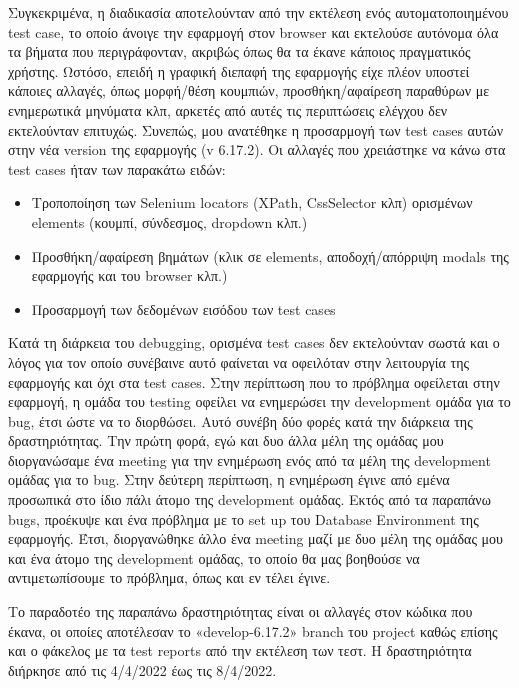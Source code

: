 Συγκεκριμένα, η διαδικασία αποτελούνταν από την εκτέλεση ενός αυτοματοποιημένου test case, το οποίο άνοιγε την εφαρμογή στον browser και 
εκτελούσε αυτόνομα όλα τα βήματα που περιγράφονταν, ακριβώς όπως θα τα έκανε κάποιος πραγματικός χρήστης. Ωστόσο, επειδή η γραφική διεπαφή 
της εφαρμογής είχε πλέον υποστεί κάποιες αλλαγές, όπως μορφή/θέση κουμπιών, προσθήκη/αφαίρεση παραθύρων με ενημερωτικά μηνύματα κλπ, αρκετές 
από αυτές τις περιπτώσεις ελέγχου δεν εκτελούνταν επιτυχώς. Συνεπώς, μου ανατέθηκε η προσαρμογή των test cases αυτών στην νέα version της 
εφαρμογής (v 6.17.2). Οι αλλαγές που χρειάστηκε να κάνω στα test cases ήταν των παρακάτω ειδών:

\begin{itemize}
    \item Τροποποίηση των Selenium locators (XPath, CssSelector κλπ) ορισμένων elements (κουμπί, σύνδεσμος, dropdown κλπ.)
    \item Προσθήκη/αφαίρεση βημάτων (κλικ σε elements, αποδοχή/απόρριψη modals της εφαρμογής και του browser κλπ.)
    \item Προσαρμογή των δεδομένων εισόδου των test cases 
\end{itemize}

Κατά τη διάρκεια του debugging, ορισμένα test cases δεν εκτελούνταν σωστά και ο λόγος για τον οποίο συνέβαινε αυτό φαίνεται να οφειλόταν 
στην λειτουργία της εφαρμογής και όχι στα test cases. Στην περίπτωση που το πρόβλημα οφείλεται στην εφαρμογή, η ομάδα του testing οφείλει 
να ενημερώσει την development ομάδα για το bug, έτσι ώστε να το διορθώσει. Αυτό συνέβη δύο φορές κατά την διάρκεια της δραστηριότητας. 
Την πρώτη φορά, εγώ και δυο άλλα μέλη της ομάδας μου διοργανώσαμε ένα meeting για την ενημέρωση ενός από τα μέλη της development ομάδας 
για το bug. Στην δεύτερη περίπτωση, η ενημέρωση έγινε από εμένα προσωπικά στο ίδιο πάλι άτομο της development ομάδας.
Εκτός από τα παραπάνω bugs, προέκυψε και ένα πρόβλημα με το set up του Database Environment της εφαρμογής. Έτσι, διοργανώθηκε άλλο ένα 
meeting μαζί με δυο μέλη της ομάδας μου και ένα άτομο της development ομάδας, το οποίο θα μας βοηθούσε να  αντιμετωπίσουμε το πρόβλημα, όπως 
και εν τέλει έγινε.

Το παραδοτέο της παραπάνω δραστηριότητας είναι οι αλλαγές στον κώδικα που έκανα, οι οποίες αποτέλεσαν το «develop-6.17.2» branch του project 
καθώς επίσης και ο φάκελος με τα test reports από την εκτέλεση των τεστ. Η δραστηριότητα διήρκησε από τις 4/4/2022 έως τις 8/4/2022.

